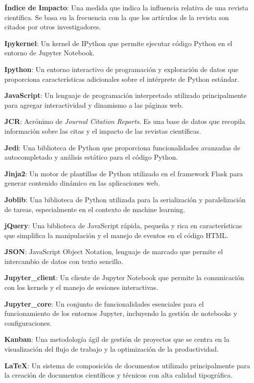 \textbf{Índice de Impacto}: Una medida que indica la influencia relativa de una revista científica. Se basa en la frecuencia con la que los artículos de la revista son citados por otros investigadores.

\textbf{Ipykernel}: Un kernel de IPython que permite ejecutar código Python en el entorno de Jupyter Notebook.

\textbf{Ipython}: Un entorno interactivo de programación y exploración de datos que proporciona características adicionales sobre el intérprete de Python estándar.

\textbf{JavaScript}: Un lenguaje de programación interpretado utilizado principalmente para agregar interactividad y dinamismo a las páginas web.

\textbf{JCR}: Acrónimo de \textit{Journal Citation Reports}. Es una base de datos que recopila información sobre las citas y el impacto de las revistas científicas.

\textbf{Jedi}: Una biblioteca de Python que proporciona funcionalidades avanzadas de autocompletado y análisis estático para el código Python.

\textbf{Jinja2}: Un motor de plantillas de Python utilizado en el framework Flask para generar contenido dinámico en las aplicaciones web.

\textbf{Joblib}: Una biblioteca de Python utilizada para la serialización y paralelización de tareas, especialmente en el contexto de machine learning.

\textbf{jQuery}: Una biblioteca de JavaScript rápida, pequeña y rica en características que simplifica la manipulación y el manejo de eventos en el código HTML.

\textbf{JSON}: JavaScript Object Notation, lenguaje de marcado que permite el intercambio de datos con texto sencillo.

\textbf{Jupyter\_client}: Un cliente de Jupyter Notebook que permite la comunicación con los kernels y el manejo de sesiones interactivas.

\textbf{Jupyter\_core}: Un conjunto de funcionalidades esenciales para el funcionamiento de los entornos Jupyter, incluyendo la gestión de notebooks y configuraciones.

\textbf{Kanban}: Una metodología ágil de gestión de proyectos que se centra en la visualización del flujo de trabajo y la optimización de la productividad.

\textbf{\LaTeX}: Un sistema de composición de documentos utilizado principalmente para la creación de documentos científicos y técnicos con alta calidad tipográfica.

